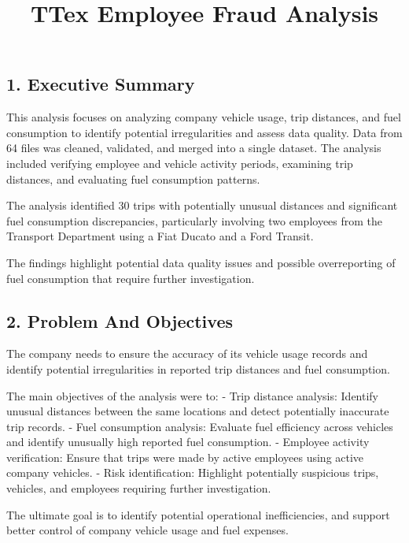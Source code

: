 \documentclass[
  letterpaper,
  DIV=11,
  numbers=noendperiod]{scrartcl}
\title{TTex Employee Fraud Analysis}
\author{}
\date{}
\renewcommand*\contentsname{Table of contents}
\newcommand\contentsname{Table of contents}
\begin{document}
\maketitle

\renewcommand*\contentsname{Table of Contents}
{
\setcounter{tocdepth}{3}
\tableofcontents
}

\subsection{1. Executive Summary}\label{executive-summary}

This analysis focuses on analyzing company vehicle usage, trip
distances, and fuel consumption to identify potential irregularities and
assess data quality. Data from 64 files was cleaned, validated, and
merged into a single dataset. The analysis included verifying employee
and vehicle activity periods, examining trip distances, and evaluating
fuel consumption patterns.

The analysis identified 30 trips with potentially unusual distances and
significant fuel consumption discrepancies, particularly involving two
employees from the Transport Department using a Fiat Ducato and a Ford
Transit.

The findings highlight potential data quality issues and possible
overreporting of fuel consumption that require further investigation.

\subsection{2. Problem And Objectives}\label{problem-and-objectives}

The company needs to ensure the accuracy of its vehicle usage records
and identify potential irregularities in reported trip distances and
fuel consumption.

The main objectives of the analysis were to: - Trip distance analysis:
Identify unusual distances between the same locations and detect
potentially inaccurate trip records. - Fuel consumption analysis:
Evaluate fuel efficiency across vehicles and identify unusually high
reported fuel consumption. - Employee activity verification: Ensure that
trips were made by active employees using active company vehicles. -
Risk identification: Highlight potentially suspicious trips, vehicles,
and employees requiring further investigation.

The ultimate goal is to identify potential operational inefficiencies,
and support better control of company vehicle usage and fuel expenses.
\end{document}

